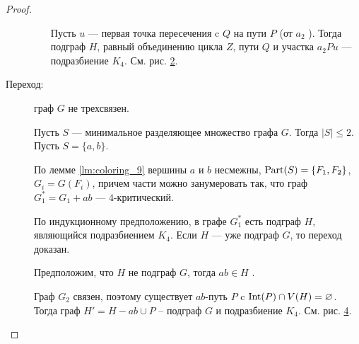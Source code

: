 \begin{proof}
\begin{description}
\begin{itemize}
					Пусть $u$ --- первая точка пересечения c $Q$ на пути $P$ (от $a_2$ ). Тогда подграф $H$, равный объединению цикла $Z$, пути $Q$ и участка $a_2Pu$ --- подразбиение $K_4$. См. рис. \ref{fig:dirac-lemma-2}.
			\end{itemize}
		\begin{figure}[ht]
			\centering
			\begin{subfigure}{0.3\textwidth}
				\caption{}
				\label{fig:dirac-lemma-1}
			\end{subfigure}
			\hfill
			\begin{subfigure}{0.3\textwidth}
				\caption{}
				\label{fig:dirac-lemma-2}
			\end{subfigure}
			\hfill
			\begin{subfigure}{0.3\textwidth}
				\caption{}
				\label{fig:dirac-lemma-3}
			\end{subfigure}
		\end{figure}
	\item[Переход:] граф $G$ не трехсвязен.

		Пусть $S $ --- минимальное разделяющее множество графа $G$. Тогда $\lvert S \rvert \le 2$. Пусть $S = \{a, b\}$.

		По лемме \ref{lm:coloring_9} вершины $a$ и $b$ несмежны,  $\operatorname{Part}(S) = \{F_1, F_2\}$, $G_i = G(F_i)$, причем части можно занумеровать так, что граф  $G_1^* = G_1 + ab$ --- $4$-критический.

		По индукционному предположению, в графе $G_1^*$ есть подграф $H$, являющийся подразбиением $K_4$. Если $H$ --- уже подграф $G$, то переход доказан.

		Предположим, что $H$ не подграф $G$, тогда $ ab \in H$ . 

		Граф $G_2$ связен, поэтому существует $ab$-путь $P$ c $\operatorname{Int}(P) \cap V(H) = \varnothing$. Тогда граф $H' = H - ab \cup P$ -- подграф $G$ и подразбиение $K_4$. См. рис. \ref{fig:dirac-lemma-3}.
	\end{description}
\end{proof}
